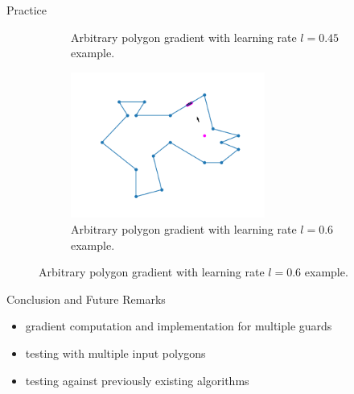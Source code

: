 \documentclass{beamer}
\begin{document}
\begin{frame}{Practice}
\begin{figure}[h!]
\begin{subfigure}{0.45\textwidth}
			\caption{Arbitrary polygon gradient with learning rate $l = 0.45$ example.}
			\label{fig:random_gradient_045}
		\end{subfigure}
		\begin{subfigure}{0.45\textwidth}
			\centering
			\includegraphics[width = 0.7\textwidth]{Images/random_gradient_06.png}
			\caption{Arbitrary polygon gradient with learning rate $l = 0.6$ example.}
			\label{fig:random_gradient_06}
		\end{subfigure}
		\label{fig:multiple_gradients}
	\end{figure}
\end{frame}
\begin{frame}{Conclusion and Future Remarks}
	\begin{itemize}
		\item gradient computation and implementation for multiple guards
		\item testing with multiple input polygons
		\item testing against previously existing algorithms \cite{DBLP:journals/corr/abs-2007-06920}
	\end{itemize}
\end{frame}
\end{document}

